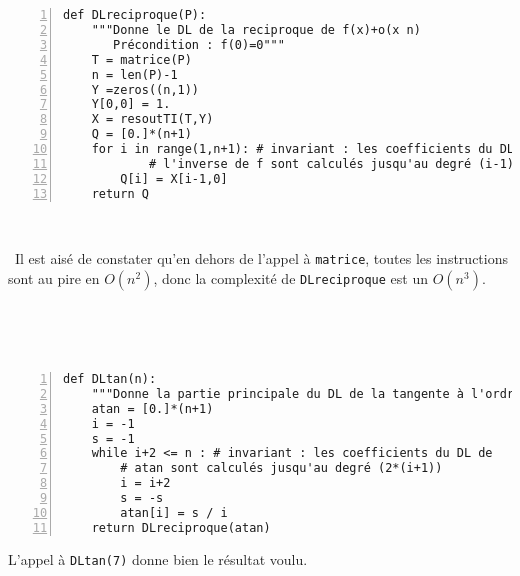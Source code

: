 \medskip\

\question\
\begin{Verbatim}[gobble=0,numbers=left]
def DLreciproque(P):
    """Donne le DL de la reciproque de f(x)+o(x n)
       Précondition : f(0)=0"""
    T = matrice(P)
    n = len(P)-1
    Y =zeros((n,1))
    Y[0,0] = 1.
    X = resoutTI(T,Y)
    Q = [0.]*(n+1)
    for i in range(1,n+1): # invariant : les coefficients du DL de 
			# l'inverse de f sont calculés jusqu'au degré (i-1)
        Q[i] = X[i-1,0]
    return Q

\end{Verbatim}
 
\medskip\

\question\ Il est aisé de constater qu'en dehors de l'appel à \texttt{matrice}, toutes les instructions sont au pire en 
$O(n^2)$, donc la complexité de \texttt{DLreciproque} est un $O(n^3)$.

\medskip\

\question\
\begin{Verbatim}[gobble=0,numbers=left]
def DLtan(n):
    """Donne la partie principale du DL de la tangente à l'ordre n"""
    atan = [0.]*(n+1)
    i = -1
    s = -1
    while i+2 <= n : # invariant : les coefficients du DL de 
		# atan sont calculés jusqu'au degré (2*(i+1))
        i = i+2
        s = -s
        atan[i] = s / i
    return DLreciproque(atan)
\end{Verbatim}

L'appel à \texttt{DLtan(7)} donne bien le résultat voulu.